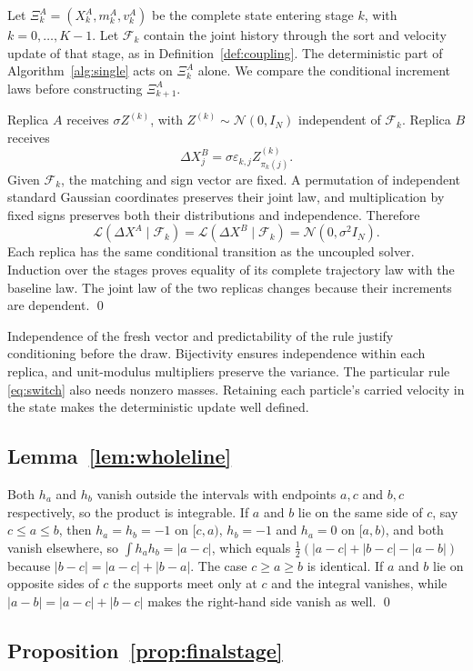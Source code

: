 \documentclass[smallextended,nospthms]{svjour3}
\theoremstyle{plain}
\theoremstyle{definition}
\theoremstyle{remark}
\numberwithin{equation}{section}
\newcommand{\Fil}{\mathcal{F}}
\begin{document}
Let $\Xi^A_k=(X^A_k,m^A_k,v^A_k)$ be the complete state entering
stage $k$, with $k=0,\ldots,K-1$. Let $\Fil_k$ contain the joint history
through the sort and velocity update of that stage, as in
Definition~\ref{def:coupling}. The deterministic part of
Algorithm~\ref{alg:single} acts on $\Xi^A_k$ alone. We compare the conditional
increment laws before constructing $\Xi^A_{k+1}$.

Replica $A$ receives $\sigma Z^{(k)}$, with
$Z^{(k)}\sim\mathcal N(0,I_N)$ independent of $\Fil_k$. Replica $B$ receives
\[
 \Delta X^B_j=\sigma\varepsilon_{k,j}Z^{(k)}_{\pi_k(j)}.
\]
Given $\Fil_k$, the matching and sign vector are fixed. A permutation of
independent standard Gaussian coordinates preserves their joint law, and
multiplication by fixed signs preserves both their distributions and
independence. Therefore
\[
 \mathcal L(\Delta X^A\mid\Fil_k)
 =\mathcal L(\Delta X^B\mid\Fil_k)
 =\mathcal N(0,\sigma^2 I_N).
\]
Each replica has the same conditional transition as the uncoupled solver.
Induction over the stages proves equality of its complete trajectory law
with the baseline law. The joint law of the two replicas changes because
their increments are dependent. \qed

Independence of the fresh vector and predictability of the rule justify
conditioning before the draw. Bijectivity ensures independence within each
replica, and unit-modulus multipliers preserve the variance. The particular
rule \eqref{eq:switch} also needs nonzero masses. Retaining each particle's
carried velocity in the state makes the deterministic update well defined.

\subsection{Lemma~\ref{lem:wholeline}}

Both $h_a$ and $h_b$ vanish outside the intervals with endpoints $a,c$ and
$b,c$ respectively, so the product is integrable. If $a$ and $b$ lie on the
same side of $c$, say $c\le a\le b$, then $h_a=h_b=-1$ on $[c,a)$, $h_b=-1$ and
$h_a=0$ on $[a,b)$, and both vanish elsewhere, so
$\int h_ah_b=|a-c|$, which equals $\tfrac12(|a-c|+|b-c|-|a-b|)$ because
$|b-c|=|a-c|+|b-a|$. The case $c\ge a\ge b$ is identical. If $a$ and $b$ lie on
opposite sides of $c$ the supports meet only at $c$ and the integral vanishes,
while $|a-b|=|a-c|+|b-c|$ makes the right-hand side vanish as well. \qed

\subsection{Proposition~\ref{prop:finalstage}}
\end{document}
